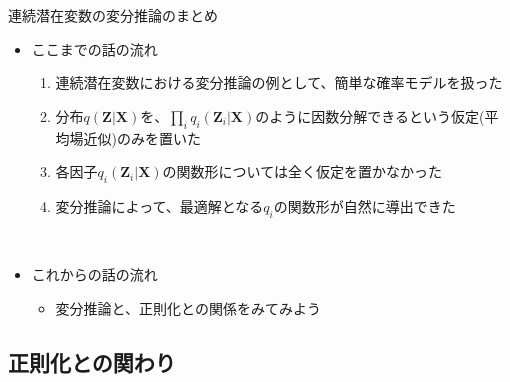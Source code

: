 \documentclass[dvipdfmx,notheorems,t]{beamer}
\begin{document}
\begin{frame}{連続潜在変数の変分推論のまとめ}

\begin{itemize}
	\item ここまでの話の流れ
	\begin{enumerate}
		\item 連続潜在変数における変分推論の例として、簡単な確率モデルを扱った
		\newline
		\item 分布$q(\bm{Z} | \bm{X})$を、$\prod_i q_i(\bm{Z}_i | \bm{X})$のように因数分解できるという仮定(\alert{平均場近似})のみを置いた
		\item 各因子$q_i(\bm{Z}_i | \bm{X})$の関数形については全く仮定を置かなかった
		\newline
		\item 変分推論によって、最適解となる$q_i$の関数形が自然に導出できた
	\end{enumerate} \
	
	\item これからの話の流れ
	\begin{itemize}
		\item 変分推論と、正則化との関係をみてみよう
	\end{itemize}
\end{itemize}

\end{frame}

\subsection{正則化との関わり}
\end{document}
